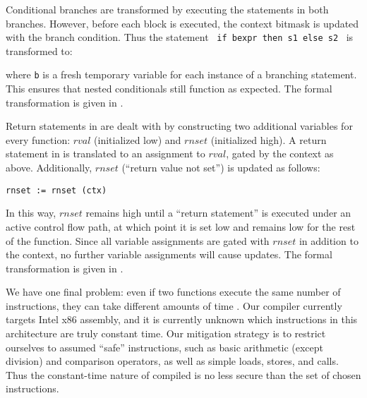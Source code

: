 Conditional branches are transformed by executing the statements in both
branches. However, before each block is executed, the context bitmask is updated
with the branch condition. Thus the statement ~\texttt{if bexpr then s1 else
s2}~ is transformed to:
\begin{center}
\end{center}
where \texttt{b} is a fresh temporary variable for each instance of a branching
statement. This ensures that nested conditionals still function as expected. The formal transformation is given in .

Return statements in \constc are dealt with by constructing two additional
variables for every function: $rval$ (initialized low) and $rnset$ (initialized
high). A return statement in \constc is translated to an assignment to $rval$,
gated by the context as above.  Additionally, $rnset$ (``return value not set'')
is updated as follows:
\begin{center}
  \texttt{rnset := rnset \band (\bnot ctx)}
\end{center}
In this way, $rnset$ remains high until a ``return statement'' is executed under
an active control flow path, at which point it is set low and remains low for
the rest of the function. Since all variable assignments are gated with $rnset$
in addition to the context, no further variable assignments will cause updates.
The formal transformation is given in .

We have one final problem: even if two functions execute the same number of
instructions, they can take different amounts of time . Our compiler
currently targets Intel x86 assembly, and it is currently unknown  which instructions in this architecture are truly constant time. Our
mitigation strategy is to restrict ourselves to assumed ``safe'' instructions,
such as basic arithmetic (except division) and comparison operators, as well as
simple loads, stores, and calls. Thus the constant-time nature of compiled
\ccore is no less secure than the set of chosen instructions.
